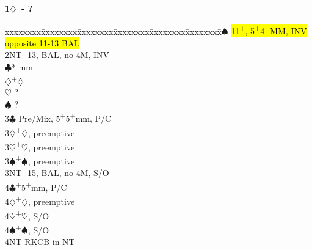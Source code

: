 \documentclass[10pt]{article}
\renewcommand{\c}{$\clubsuit$}
\renewcommand{\d}{$\diamondsuit$}
\newcommand{\h}{$\heartsuit$}
\newcommand{\s}{$\spadesuit$}
\newcommand{\p}{\textsuperscript{+}}
\newcommand{\x}{DBL}
\newenvironment{bidtable}[1][]
{\textbf{#1}
  \begin{adjustwidth}{1em}{}
    \addvspace{2pt}
    \begin{tabbing}
      xxxxxxxx\=xxxxxxxx\=xxxxxxxx\=xxxxxxxx\=xxxxxxxx\=xxxxxxxx\=\kill}
{\end{tabbing}\end{adjustwidth}\bigskip}%
\begin{document}
\begin{multicols*}{2}
\begin{bidtable}[1\d\ - ?]
2\s       \> \hl{11\p, 5\p4\p MM, INV opposite 11-13 BAL}     \\
2NT       -13, BAL, no 4M, INV                           \\
          \c*       {} mm                              \\
          \d        {}\p\d                              \\
          \h        \> ?                                  \\
          \s        \> ?                                  \\
3\c       \> Pre/Mix, 5\p 5\p mm, P/C                         \\
3\d       {}\p\d, preemptive                                \\
3\h       {}\p\h, preemptive                                \\
3\s       {}\p\s, preemptive                                \\
3NT       -15, BAL, no 4M, S/O                           \\
4\c       {}\p 5\p mm, P/C                                  \\
4\d       {}\p\d, preemptive                                \\
4\h       {}\p\h, S/O                                       \\
4\s       {}\p\s, S/O                                       \\
4NT       \> RKCB in NT
\end{bidtable}


\end{multicols*}
\end{document}
